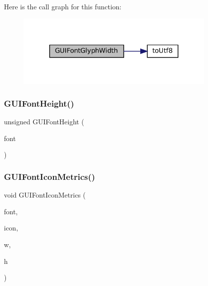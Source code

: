 Here is the call graph for this function\+:
\nopagebreak
\begin{figure}[H]
\begin{center}
\leavevmode
\includegraphics[width=276pt]{psp2_2gui-font_8c_a4b38c72440f93dd3f4c6d01848a23203_cgraph}
\end{center}
\end{figure}
\mbox{\label{psp2_2gui-font_8c_a6d539c7b23450b8918bb6499e2c11042}} 
\subsubsection{\texorpdfstring{G\+U\+I\+Font\+Height()}{GUIFontHeight()}}
{\footnotesize\ttfamily unsigned G\+U\+I\+Font\+Height (\begin{DoxyParamCaption}\item[{const struct G\+U\+I\+Font $\ast$}]{font }\end{DoxyParamCaption})}

\mbox{\label{psp2_2gui-font_8c_a70534a7637eda192a15884d8930a61b8}} 
\subsubsection{\texorpdfstring{G\+U\+I\+Font\+Icon\+Metrics()}{GUIFontIconMetrics()}}
{\footnotesize\ttfamily void G\+U\+I\+Font\+Icon\+Metrics (\begin{DoxyParamCaption}\item[{const struct G\+U\+I\+Font $\ast$}]{font,  }\item[{enum G\+U\+I\+Icon}]{icon,  }\item[{unsigned $\ast$}]{w,  }\item[{unsigned $\ast$}]{h }\end{DoxyParamCaption})}



